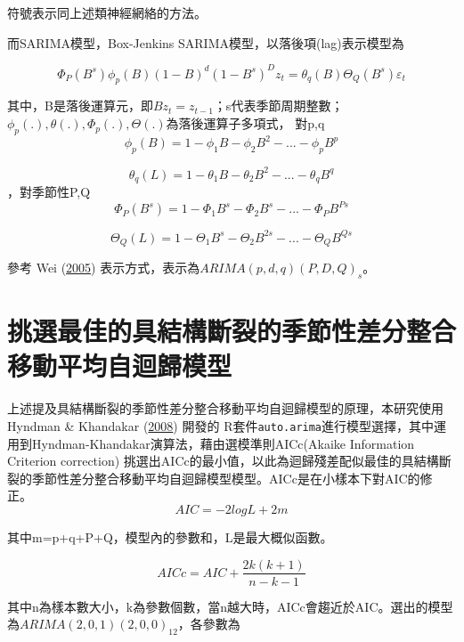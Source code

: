 \documentclass[oneside]{book}
\begin{document}
符號表示同上述類神經網絡的方法。

而SARIMA模型，Box-Jenkins SARIMA模型，以落後項(lag)表示模型為

\[\Phi_P(B^s)\phi_p(B)(1-B)^d(1-B^s)^D z_t = \theta_q(B)\Theta_Q(B^s)\varepsilon_t\]

其中，B是落後運算元，即\(Bz_t=z_{t-1}\)；s代表季節周期整數；\(\phi_p(.),\theta(.),\Phi_p(.),\Theta(.)\)為落後運算子多項式，
對p,q\\
\[\phi_p(B) = 1-\phi_1B-\phi_2B^{2}-...-\phi_{p}B^{p}\]

\[\theta_q(L) = 1-\theta_1B-\theta_2B^{2}-...-\theta_qB^{q}\]
，對季節性P,Q
\[\Phi_P(B^s) = 1-\Phi_1B^s-\Phi_2B^s-...-\Phi_{P}B^{Ps}\]

\[\Theta_Q(L) = 1-\Theta_1B^s-\Theta_2B^{2s}-...-\Theta_QB^{Qs}\]

參考 Wei (\protect\hyperlink{ref-weiTimeSeriesAnalysis2005}{2005}) 表示方式，表示為\(ARIMA(p,d,q)(P,D,Q)_s\)。

\hypertarget{ux6311ux9078ux6700ux4f73ux7684ux5177ux7d50ux69cbux65b7ux88c2ux7684ux5b63ux7bc0ux6027ux5deeux5206ux6574ux5408ux79fbux52d5ux5e73ux5747ux81eaux8ff4ux6b78ux6a21ux578b}{%
\section{挑選最佳的具結構斷裂的季節性差分整合移動平均自迴歸模型}\label{ux6311ux9078ux6700ux4f73ux7684ux5177ux7d50ux69cbux65b7ux88c2ux7684ux5b63ux7bc0ux6027ux5deeux5206ux6574ux5408ux79fbux52d5ux5e73ux5747ux81eaux8ff4ux6b78ux6a21ux578b}}

上述提及具結構斷裂的季節性差分整合移動平均自迴歸模型的原理，本研究使用 Hyndman \& Khandakar (\protect\hyperlink{ref-hyndmanAutomaticTimeSeries2008}{2008}) 開發的 R套件\texttt{auto.arima}進行模型選擇，其中運用到Hyndman-Khandakar演算法，藉由選模準則AICc(Akaike Information Criterion correction) 挑選出AICc的最小值，以此為迴歸殘差配似最佳的具結構斷裂的季節性差分整合移動平均自迴歸模型模型。AICc是在小樣本下對AIC的修正。
\[AIC = -2logL+2m\]

其中m=p+q+P+Q，模型內的參數和，L是最大概似函數。

\[AICc = AIC+\frac{2k(k+1)}{n-k-1}\]

其中n為樣本數大小，k為參數個數，當n越大時，AICc會趨近於AIC。選出的模型為\(ARIMA(2,0,1)(2,0,0)_{12}\)，各參數為
\end{document}
